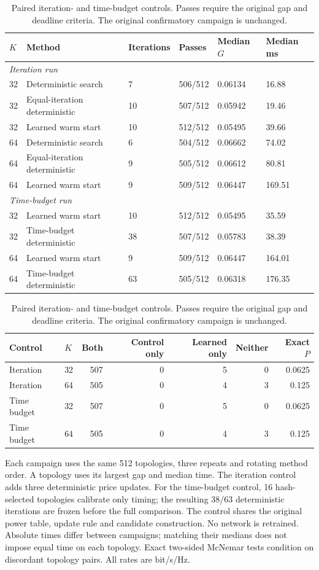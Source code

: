 \documentclass[10pt,letterpaper]{article}
\begin{document}
\begin{table}[htbp]\centering\small
\setlength{\tabcolsep}{4pt}
\caption{Paired iteration- and time-budget controls. Passes require the original gap and deadline criteria. The original confirmatory campaign is unchanged.}\label{supp:compute}
\begin{tabular}{llllll}\toprule
$K$ & Method & Iterations & Passes & Median $G$ & Median ms\\
\midrule
\multicolumn{6}{l}{\textit{Iteration run}}\\
32 & Deterministic search & 7 & 506/512 & 0.06134 & 16.88\\
32 & Equal-iteration deterministic & 10 & 507/512 & 0.05942 & 19.46\\
32 & Learned warm start & 10 & 512/512 & 0.05495 & 39.66\\
64 & Deterministic search & 6 & 504/512 & 0.06662 & 74.02\\
64 & Equal-iteration deterministic & 9 & 505/512 & 0.06612 & 80.81\\
64 & Learned warm start & 9 & 509/512 & 0.06447 & 169.51\\
\multicolumn{6}{l}{\textit{Time-budget run}}\\
32 & Learned warm start & 10 & 512/512 & 0.05495 & 35.59\\
32 & Time-budget deterministic & 38 & 507/512 & 0.05783 & 38.39\\
64 & Learned warm start & 9 & 509/512 & 0.06447 & 164.01\\
64 & Time-budget deterministic & 63 & 505/512 & 0.06318 & 176.35\\
\bottomrule\end{tabular}
\par\medskip\begin{minipage}{\linewidth}\small
\par\smallskip\noindent\begin{tabular}{llrrrrr}\toprule Control & $K$ & Both & Control only & Learned only & Neither & Exact $P$\\\midrule
Iteration & 32 & 507 & 0 & 5 & 0 & 0.0625\\
Iteration & 64 & 505 & 0 & 4 & 3 & 0.125\\
Time budget & 32 & 507 & 0 & 5 & 0 & 0.0625\\
Time budget & 64 & 505 & 0 & 4 & 3 & 0.125\\
\bottomrule\end{tabular}\par\smallskip
Each campaign uses the same 512 topologies, three repeats and rotating method order. A topology uses its largest gap and median time. The iteration control adds three deterministic price updates. For the time-budget control, 16 hash-selected topologies calibrate only timing; the resulting 38/63 deterministic iterations are frozen before the full comparison. The control shares the original power table, update rule and candidate construction. No network is retrained. Absolute times differ between campaigns; matching their medians does not impose equal time on each topology. Exact two-sided McNemar tests condition on discordant topology pairs. All rates are bit/s/Hz.
\end{minipage}
\end{table}
\end{document}
